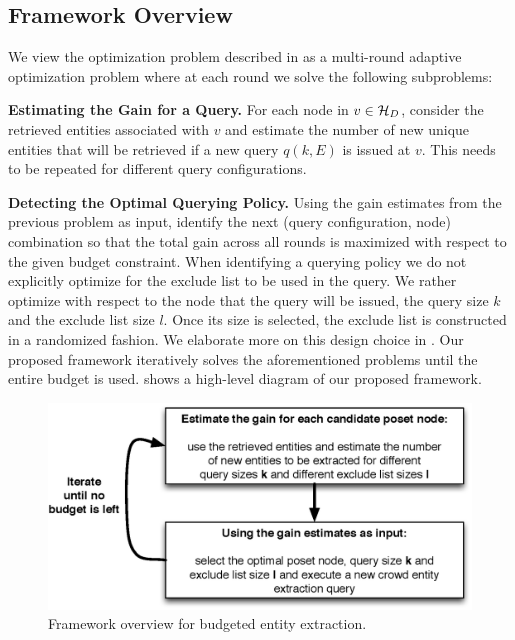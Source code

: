 \subsection{Framework Overview}
\label{sec:framework}
We view the optimization problem described in  as a multi-round adaptive optimization problem where at each round we solve the following subproblems: 
\squishlist 
\item \textbf{Estimating the Gain for a Query.} For each node in $v \in \mathcal{H}_D$, consider the retrieved entities associated with $v$ and estimate the number of new unique entities that will be retrieved if a new query $q(k,E)$ is issued at $v$. This needs to be repeated for different query configurations. 
\item \textbf{Detecting the Optimal Querying Policy.} Using the gain estimates from the previous problem as input, identify the next (query configuration, node) combination so that the total gain across all rounds is maximized with respect to the given budget constraint. When identifying a querying policy we do not explicitly optimize for the exclude list to be used in the query. We rather optimize with respect to the node that the query will be issued, the query size $k$ and the exclude list size $l$. Once its size is selected, the exclude list is constructed in a randomized fashion. We elaborate more on this design choice in .
\squishend
Our proposed framework iteratively solves the aforementioned problems until the entire budget is used. \iftr {} shows a high-level diagram of our proposed framework.

\begin{figure}
	\begin{center}
	\includegraphics[clip,scale=0.43]{figs/framework.eps}
	\vspace{-10pt}
	\caption{Framework overview for budgeted entity extraction.}
	\label{fig:framework}
	\end{center}
	\vspace{-20pt}
\end{figure}
\fi